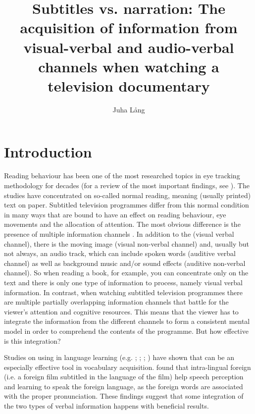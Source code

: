 \documentclass[output=paper]{langsci/langscibook}
\author{Juha Lång\affiliation{University of Eastern Finland}
}
\title{Subtitles vs. narration: {T}he acquisition of information from visual-verbal and audio-verbal channels when watching a television documentary}
\begin{document}
  



\section{Introduction}
 
Reading behaviour has been one of the most researched topics in eye tracking methodology for decades (for a review of the most important findings, see \citealt{Rayner1998, Rayner2009}). The studies have concentrated on so-called normal reading, meaning (usually printed) text on paper. Subtitled television programmes differ from this normal condition in many ways that are bound to have an effect on reading behaviour, eye movements and the allocation of attention. The most obvious difference is the presence of multiple information channels \citep{Gottlieb1998}. In addition to the  (visual verbal channel), there is the moving image (visual non-verbal channel) and, usually but not always, an audio track, which can include spoken words (auditive verbal channel) as well as background music and/or sound effects (auditive non-verbal channel). So when reading a book, for example, you can concentrate only on the text and there is only one type of information to process, namely visual verbal information. In contrast, when watching subtitled television programmes there are multiple partially overlapping information channels that battle for the viewer's attention and cognitive resources. This means that the viewer has to integrate the information from the different channels to form a consistent mental model in order to comprehend the contents of the programme. But how effective is this integration?
 
Studies on using  in language learning (e.g. \citealt{Koolstra1999childrens}; \citealt{Latifi2011}; \citealt{Etemadi2012}; \citealt{Ghia2012}) have shown that  can be an especially effective tool in vocabulary acquisition. \citet{mitterer2009} found that intra-lingual foreign  (i.e. a foreign film subtitled in the language of the film) help speech perception and learning to speak the foreign language, as the foreign words are associated with the proper pronunciation. These findings suggest that some integration of the two types of verbal information happens with beneficial results.
\end{document}
